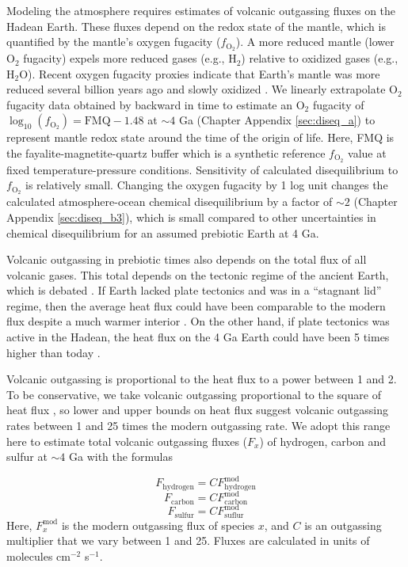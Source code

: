 Modeling the atmosphere requires estimates of volcanic outgassing fluxes on the Hadean Earth. These fluxes depend on the redox state of the mantle, which is quantified by the mantle's oxygen fugacity ($f_\mathrm{O_2}$). A more reduced mantle (lower O$_2$ fugacity) expels more reduced gases (e.g., H$_2$) relative to oxidized gases (e.g., H$_2$O). Recent oxygen fugacity proxies indicate that Earth's mantle was more reduced several billion years ago and slowly oxidized \citep{Aulbach_2016,Nicklas_2019}. We linearly extrapolate O$_2$ fugacity data obtained by \citet{Aulbach_2016} backward in time to estimate an O$_2$ fugacity of $\log_{10}\left(f_\mathrm{O_2}\right) = \mathrm{FMQ} - 1.48$ at $\sim 4$ Ga (Chapter Appendix \ref{sec:diseq_a}) to represent mantle redox state around the time of the origin of life. Here, FMQ is the fayalite-magnetite-quartz buffer which is a synthetic reference $f_\mathrm{O_2}$ value at fixed temperature-pressure conditions. Sensitivity of calculated disequilibrium to $f_\mathrm{O_2}$ is relatively small. Changing the oxygen fugacity by 1 log unit changes the calculated atmosphere-ocean chemical disequilibrium by a factor of $\sim 2$ (Chapter Appendix \ref{sec:diseq_b3}), which is small compared to other uncertainties in chemical disequilibrium for an assumed prebiotic Earth at 4 Ga.

Volcanic outgassing in prebiotic times also depends on the total flux of all volcanic gases. This total depends on the tectonic regime of the ancient Earth, which is debated \citep{Rosas_2018}. If Earth lacked plate tectonics and was in a ``stagnant lid'' regime, then the average heat flux could have been comparable to the modern flux despite a much warmer interior \citep{Korenaga_2009}. On the other hand, if plate tectonics was active in the Hadean, the heat flux on the 4 Ga Earth could have been 5 times higher than today \citep{Sleep_2001}.

Volcanic outgassing is proportional to the heat flux to a power between 1 and 2. To be conservative, we take volcanic outgassing proportional to the square of heat flux \citep{Sleep_2001}, so lower and upper bounds on heat flux suggest volcanic outgassing rates between 1 and 25 times the modern outgassing rate. We adopt this range here to estimate total volcanic outgassing fluxes ($F_x$) of hydrogen, carbon and sulfur at $\sim 4$ Ga with the formulas

\begin{equation}
  \label{eq:h_volc_flux}
  F_\mathrm{hydrogen} = C F_\mathrm{hydrogen}^\mathrm{mod}
\end{equation}
\begin{equation}
  \label{eq:c_volc_flux}
  F_\mathrm{carbon} = C F_\mathrm{carbon}^\mathrm{mod}
\end{equation}
\begin{equation}
  \label{eq:s_volc_flux}
  F_\mathrm{sulfur} = C F_\mathrm{suflur}^\mathrm{mod}
\end{equation}
Here, $F_x^\mathrm{mod}$ is the modern outgassing flux of species $x$, and $C$ is an outgassing multiplier that we vary between 1 and 25. Fluxes are calculated in units of molecules cm$^{-2}$ s$^{-1}$.

